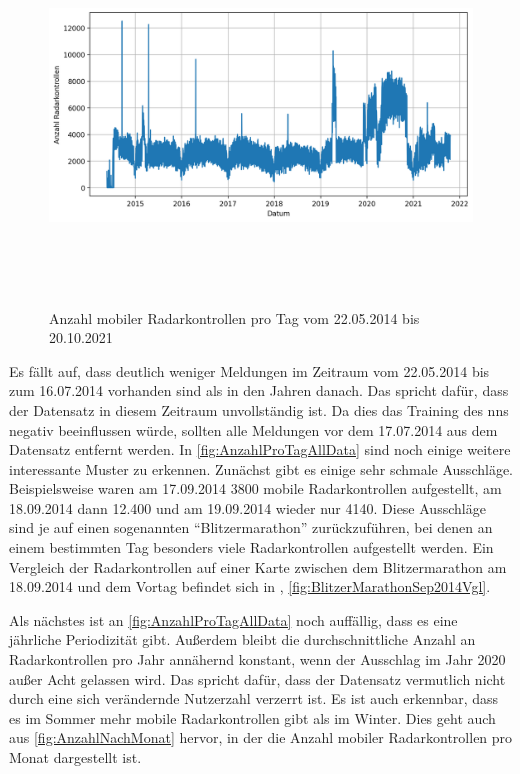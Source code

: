 \begin{figure}[h]
    \centering
    \includegraphics[width=1.0\textwidth,height=10cm,keepaspectratio=true]{content/images/AnzahlProTagAllData.png}
    \caption{Anzahl mobiler Radarkontrollen pro Tag vom 22.05.2014 bis 20.10.2021}
    \label{fig:AnzahlProTagAllData}
\end{figure}

Es fällt auf, dass deutlich weniger Meldungen im Zeitraum vom 22.05.2014 bis zum 16.07.2014 vorhanden sind als in den Jahren danach.
Das spricht dafür, dass der Datensatz in diesem Zeitraum unvollständig ist.
Da dies das Training des \acrshort{nn}s negativ beeinflussen würde, sollten alle Meldungen vor dem 17.07.2014 aus dem Datensatz entfernt werden.
In \autoref{fig:AnzahlProTagAllData} sind noch einige weitere interessante Muster zu erkennen.
Zunächst gibt es einige sehr schmale Ausschläge.
Beispielsweise waren am 17.09.2014 3800 mobile Radarkontrollen aufgestellt, am 18.09.2014 dann 12.400 und am 19.09.2014 wieder nur 4140.
Diese Ausschläge sind je auf einen sogenannten "`Blitzermarathon"' zurückzuführen, bei denen an einem bestimmten Tag besonders viele Radarkontrollen aufgestellt werden.
Ein Vergleich der Radarkontrollen auf einer Karte zwischen dem Blitzermarathon am 18.09.2014 und dem Vortag befindet sich in , \autoref{fig:BlitzerMarathonSep2014Vgl}.

Als nächstes ist an \autoref{fig:AnzahlProTagAllData} noch auffällig, dass es eine jährliche Periodizität gibt.
Außerdem bleibt die durchschnittliche Anzahl an Radarkontrollen pro Jahr annähernd konstant, wenn der Ausschlag im Jahr 2020 außer Acht gelassen wird.
Das spricht dafür, dass der Datensatz vermutlich nicht durch eine sich verändernde Nutzerzahl verzerrt ist.
Es ist auch erkennbar, dass es im Sommer mehr mobile Radarkontrollen gibt als im Winter.
Dies geht auch aus \autoref{fig:AnzahlNachMonat} hervor, in der die Anzahl mobiler Radarkontrollen pro Monat dargestellt ist.

